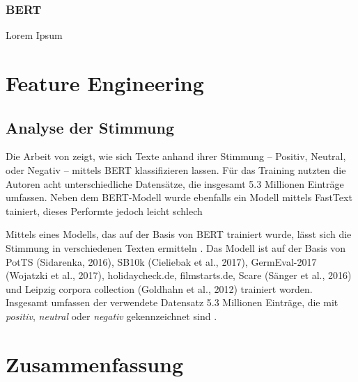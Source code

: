 \subsubsection*{BERT}

Lorem Ipsum

\section{Feature Engineering}

\subsection*{Analyse der Stimmung}


Die Arbeit von \textcite{guhr_training_2020} zeigt, wie sich Texte anhand ihrer Stimmung -- Positiv, Neutral, oder Negativ -- mittels \ac{BERT} klassifizieren lassen. Für das Training nutzten die Autoren acht unterschiedliche Datensätze, die insgesamt \num{5.3} Millionen Einträge umfassen. Neben dem \ac{BERT}-Modell wurde ebenfalls ein Modell mittels FastText tainiert, dieses Performte jedoch leicht schlech

Mittels eines Modells, das auf der Basis von \ac{BERT} trainiert wurde, lässt sich die Stimmung in verschiedenen Texten ermitteln \autocite{guhr_training_2020}. Das Modell ist auf der Basis von PotTS (Sidarenka, 2016), SB10k (Cieliebak et al., 2017), GermEval-2017 (Wojatzki et al., 2017), holidaycheck.de, filmstarts.de, Scare (Sänger et al., 2016) und Leipzig corpora collection (Goldhahn et al., 2012) trainiert worden. Insgesamt umfassen der verwendete Datensatz \num{5.3} Millionen Einträge, die mit \textit{positiv}, \textit{neutral} oder \textit{negativ} gekennzeichnet sind \autocite[1629]{guhr_training_2020}.

\section{Zusammenfassung}
